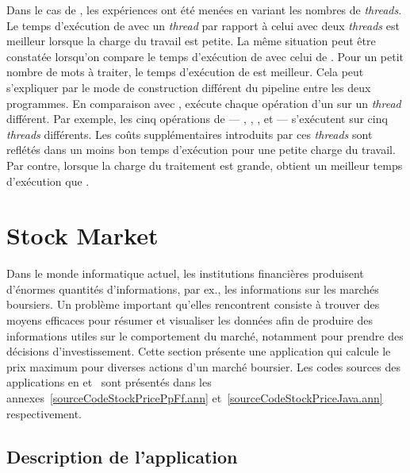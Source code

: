 Dans le cas de , les exp\'eriences ont \'et\'e men\'ees en variant les nombres de \emph{threads}. Le temps d'ex\'ecution de  avec un \emph{thread} par rapport \`a celui avec deux \emph{threads} est meilleur lorsque la charge du travail est petite. La m\^eme situation peut \^etre constat\'ee lorsqu'on compare le temps d'ex\'ecution de  avec celui de . Pour un petit nombre de mots \`a traiter, le temps d'ex\'ecution de  est meilleur. Cela peut s'expliquer par le mode de construction diff\'erent du pipeline entre les deux programmes. En comparaison avec ,  ex\'ecute chaque op\'eration d'un  sur un \emph{thread} diff\'erent. Par exemple, les cinq op\'erations de  --- , , ,  et  --- s'ex\'ecutent sur cinq \emph{threads} diff\'erents. Les co\^uts suppl\'ementaires introduits par ces \emph{threads} sont refl\'et\'es dans un moins bon temps d'ex\'ecution pour une petite charge du travail. Par contre, lorsque la charge du traitement est grande,  obtient un meilleur temps d'ex\'ecution que .



\section{Stock Market}
\label{stockprice.sect}


Dans le monde informatique actuel, les institutions financi\`eres produisent d'\'enormes quantit\'es d'informations, par ex., les informations sur les march\'es boursiers. Un probl\`eme important qu'elles rencontrent consiste \`a trouver des moyens efficaces pour r\'esumer et visualiser les donn\'ees afin de produire des informations utiles sur le comportement du march\'e, notamment pour prendre des d\'ecisions d'investissement. Cette section pr\'esente une application qui calcule le prix maximum pour diverses actions d'un marché boursier. Les codes sources des applications  en  et~ sont pr\'esent\'es dans les annexes~\ref{sourceCodeStockPricePpFf.ann} et~\ref{sourceCodeStockPriceJava.ann} respectivement. 

\subsection{Description de l'application}

